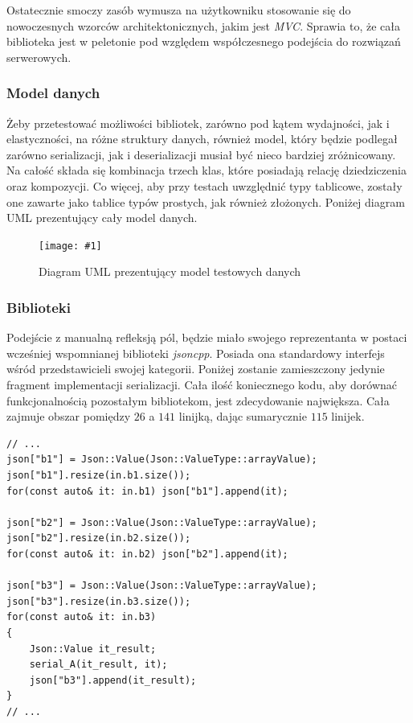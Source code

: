 \documentclass[12pt]{article}
\newcommand{\n}{\newline}
\newcommand{\putfig}[3]{
	\begin{figure}[H]
	\centering
	\texttt{[image: \#1]}
	\caption{#2}
	\label{#3}
	\medskip
\end{figure}
}
\newcommand{\nonpl}[1]{{\it #1}}
\begin{document}
{{{				Ostatecznie smoczy zasób wymusza na użytkowniku stosowanie się do nowoczesnych wzorców architektonicznych, jakim jest \nonpl{MVC}\cite{mvc}.
				Sprawia to, że cała biblioteka jest w peletonie pod względem współczesnego podejścia do rozwiązań serwerowych.
			}

			{
				\subsubsection{Model danych}

				Żeby przetestować możliwości bibliotek, zarówno pod kątem wydajności, jak i elastyczności, na różne struktury danych,
				również model, który będzie podlegał zarówno serializacji, jak i deserializacji musiał być nieco bardziej zróżnicowany.
				Na całość składa się kombinacja trzech klas, które posiadają relację dziedziczenia oraz kompozycji. Co więcej, aby przy
				testach uwzględnić typy tablicowe, zostały one zawarte jako tablice typów prostych, jak również złożonych. Poniżej
				diagram UML prezentujący cały model danych.

				\putfig{./img/benchmark_model_uml_diagram.png}{Diagram UML prezentujący model testowych danych}{uml_diagram}
			}

			{
				\subsubsection{Biblioteki}

				Podejście z manualną refleksją pól, będzie miało swojego reprezentanta w postaci wcześniej wspomnianej biblioteki \nonpl{jsoncpp}.
				Posiada ona standardowy interfejs wśród przedstawicieli swojej kategorii. Poniżej zostanie zamieszczony jedynie fragment
				implementacji serializacji. Cała ilość koniecznego kodu, aby dorównać funkcjonalnością pozostałym bibliotekom, jest zdecydowanie
				największa. Cała zajmuje obszar pomiędzy $26$ a $141$ linijką, dając sumarycznie $115$ linijek.\n

				\begin{lstlisting}[frame=single]
// ...
json["b1"] = Json::Value(Json::ValueType::arrayValue);
json["b1"].resize(in.b1.size());
for(const auto& it: in.b1) json["b1"].append(it);

json["b2"] = Json::Value(Json::ValueType::arrayValue);
json["b2"].resize(in.b2.size());
for(const auto& it: in.b2) json["b2"].append(it);

json["b3"] = Json::Value(Json::ValueType::arrayValue);
json["b3"].resize(in.b3.size());
for(const auto& it: in.b3)
{
	Json::Value it_result;
	serial_A(it_result, it);
	json["b3"].append(it_result);
}
// ...
				\end{lstlisting}

}}}
\end{document}
